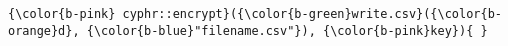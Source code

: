\documentclass[class=minimal,border=0]{standalone}
\begin{document}
%
\begin{BVerbatim}[bgcolor=b-darkgrey]
{\color{b-pink} cyphr::encrypt}({\color{b-green}write.csv}({\color{b-orange}d}, {\color{b-blue}"filename.csv"}), {\color{b-pink}key}){ }
\end{BVerbatim}
\end{document}
